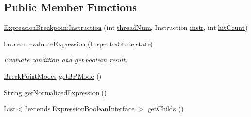 \subsection*{Public Member Functions}
\begin{DoxyCompactItemize}
\item 
\hyperlink{classgov_1_1nasa_1_1jpf_1_1inspector_1_1server_1_1expression_1_1expressions_1_1_expression_breakpoint_instruction_af3bbbaf6362cc127d219c4e44ede7ce4}{Expression\+Breakpoint\+Instruction} (int \hyperlink{classgov_1_1nasa_1_1jpf_1_1inspector_1_1server_1_1expression_1_1expressions_1_1_expression_breakpoint_instruction_ae0489eeae571443863290d903f344df4}{thread\+Num}, Instruction \hyperlink{classgov_1_1nasa_1_1jpf_1_1inspector_1_1server_1_1expression_1_1expressions_1_1_expression_breakpoint_instruction_a6b2dcad08b9b60a759ade34be81d85ad}{instr}, int \hyperlink{classgov_1_1nasa_1_1jpf_1_1inspector_1_1server_1_1expression_1_1expressions_1_1_expression_breakpoint_instruction_af26750b70ecf7859781d731fae9b2405}{hit\+Count})
\item 
boolean \hyperlink{classgov_1_1nasa_1_1jpf_1_1inspector_1_1server_1_1expression_1_1expressions_1_1_expression_breakpoint_instruction_a9fce761f3dafa426c52a8440a4aff369}{evaluate\+Expression} (\hyperlink{interfacegov_1_1nasa_1_1jpf_1_1inspector_1_1server_1_1expression_1_1_inspector_state}{Inspector\+State} state)
\begin{DoxyCompactList}\small\item\em Evaluate condition and get boolean result. \end{DoxyCompactList}\item 
\hyperlink{enumgov_1_1nasa_1_1jpf_1_1inspector_1_1server_1_1breakpoints_1_1_break_point_modes}{Break\+Point\+Modes} \hyperlink{classgov_1_1nasa_1_1jpf_1_1inspector_1_1server_1_1expression_1_1expressions_1_1_expression_breakpoint_instruction_a533e24731f0a1632b0cf2d1125e82905}{get\+B\+P\+Mode} ()
\item 
String \hyperlink{classgov_1_1nasa_1_1jpf_1_1inspector_1_1server_1_1expression_1_1expressions_1_1_expression_breakpoint_instruction_a7a3423168f9c39884f931b1577db9840}{get\+Normalized\+Expression} ()
\item 
List$<$?extends \hyperlink{interfacegov_1_1nasa_1_1jpf_1_1inspector_1_1server_1_1expression_1_1_expression_boolean_interface}{Expression\+Boolean\+Interface} $>$ \hyperlink{classgov_1_1nasa_1_1jpf_1_1inspector_1_1server_1_1expression_1_1_expression_boolean_leaf_aa99bf3cf13bd8cc1d6c33208bc83b185}{get\+Childs} ()
\item 

\end{DoxyCompactItemize}
